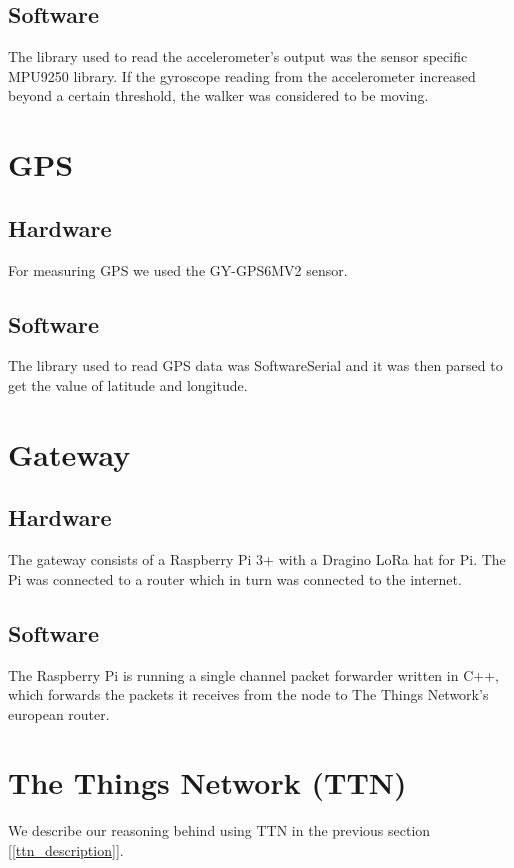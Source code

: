	\subsection{Software}
	The library used to read the accelerometer's output was the sensor specific MPU9250 library. If the gyroscope reading from the accelerometer increased beyond a certain threshold, the walker was considered to be moving.

\section{GPS}

	\subsection{Hardware}
	For measuring GPS we used the GY-GPS6MV2 sensor.

	\subsection{Software}
	The library used to read GPS data was SoftwareSerial and it was then parsed to get the value of latitude and longitude.

\section{Gateway}
		
	\subsection{Hardware}
	The gateway consists of a Raspberry Pi 3+ with a Dragino LoRa hat for Pi. The Pi was connected to a router which in turn was connected to the internet.


	\subsection{Software}
	The Raspberry Pi is running a single channel packet forwarder written in C++, which forwards the packets it receives from the node to The Things Network's european router. 

\section{The Things Network (TTN)}
	We describe our reasoning behind using TTN in the previous section [\ref{ttn_description}].

